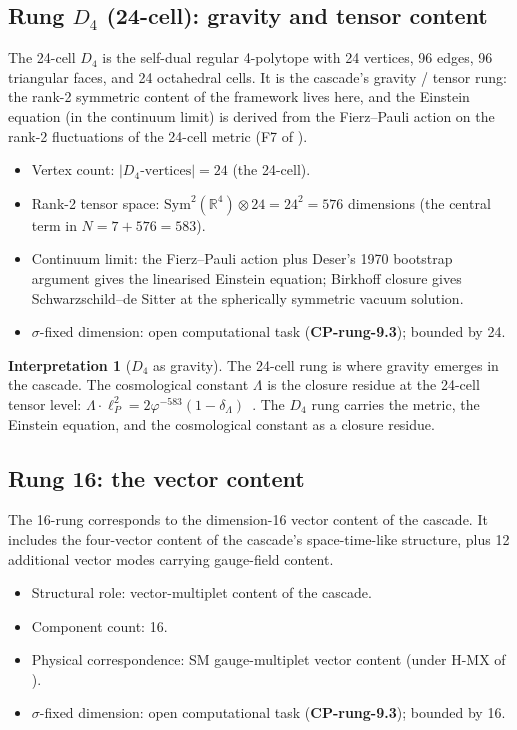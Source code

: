 \documentclass[11pt]{article}
\theoremstyle{plain}
\theoremstyle{definition}
\newtheorem{interpretation}[theorem]{Interpretation}
\theoremstyle{remark}
\newcommand{\Sym}{\mathrm{Sym}}
\begin{document}
\subsection{Rung $D_4$ (24-cell): gravity and tensor content}

The 24-cell $D_4$ is the self-dual regular 4-polytope with 24 vertices, 96 edges, 96 triangular faces, and 24 octahedral cells. It is the cascade's gravity / tensor rung: the rank-2 symmetric content of the framework lives here, and the Einstein equation (in the continuum limit) is derived from the Fierz--Pauli action on the rank-2 fluctuations of the 24-cell metric (F7 of \citet{SmartXXXVI}).

\begin{itemize}[leftmargin=2em]
\item Vertex count: $|D_4\text{-vertices}| = 24$ (the 24-cell).
\item Rank-2 tensor space: $\Sym^2(\mathbb{R}^4) \otimes 24 = 24^2 = 576$ dimensions (the central term in $N = 7 + 576 = 583$).
\item Continuum limit: the Fierz--Pauli action plus Deser's 1970 bootstrap argument gives the linearised Einstein equation; Birkhoff closure gives Schwarzschild--de Sitter at the spherically symmetric vacuum solution.
\item $\sigma$-fixed dimension: open computational task (\textbf{CP-rung-9.3}); bounded by 24.
\end{itemize}

\begin{interpretation}[$D_4$ as gravity]\label{int:rung-d4}
The 24-cell rung is where gravity emerges in the cascade. The cosmological constant $\Lambda$ is the closure residue at the 24-cell tensor level: $\Lambda \cdot \ell_P^2 = 2 \varphi^{-583}(1 - \delta_\Lambda)$~\citep{SmartHypersphereCosmology}. The $D_4$ rung carries the metric, the Einstein equation, and the cosmological constant as a closure residue.
\end{interpretation}

\subsection{Rung 16: the vector content}

The 16-rung corresponds to the dimension-16 vector content of the cascade. It includes the four-vector content of the cascade's space-time-like structure, plus 12 additional vector modes carrying gauge-field content.

\begin{itemize}[leftmargin=2em]
\item Structural role: vector-multiplet content of the cascade.
\item Component count: 16.
\item Physical correspondence: SM gauge-multiplet vector content (under H-MX of \citet{SmartXXXVI}).
\item $\sigma$-fixed dimension: open computational task (\textbf{CP-rung-9.3}); bounded by 16.
\end{itemize}
\end{document}
